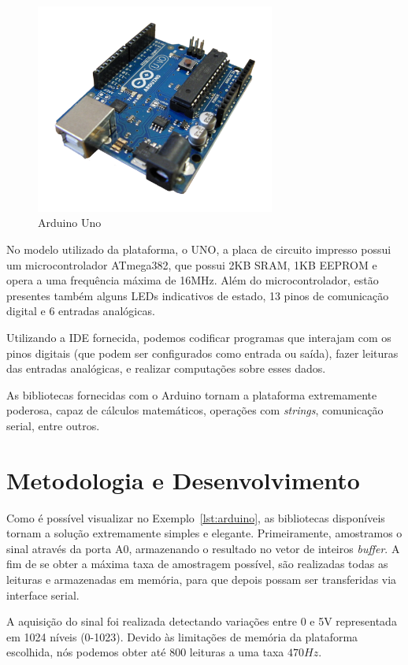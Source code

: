 \documentclass[12pt,a4paper]{report}
\begin{document}
\begin{figure}[h]
\centering
\includegraphics[width=0.7\textwidth]{arduino.png}
\caption{Arduino Uno}
\label{fig:arduino}
\end{figure}

No modelo utilizado da plataforma, o UNO, a placa de circuito impresso possui um microcontrolador ATmega382, que possui 2KB SRAM, 1KB EEPROM e opera a uma frequência máxima de 16MHz. Além do microcontrolador, estão presentes também alguns LEDs indicativos de estado, 13 pinos de comunicação digital e 6 entradas analógicas.

Utilizando a IDE fornecida, podemos codificar programas que interajam com os pinos digitais (que podem ser configurados como entrada ou saída), fazer leituras das entradas analógicas, e realizar computações sobre esses dados.

As bibliotecas fornecidas com o Arduino tornam a plataforma extremamente poderosa, capaz de cálculos matemáticos, operações com \textit{strings}, comunicação serial, entre outros.

\section{Metodologia e Desenvolvimento}

Como é possível visualizar no Exemplo~\ref{lst:arduino}, as bibliotecas disponíveis tornam a solução extremamente simples e elegante. Primeiramente, amostramos o sinal através da porta A0, armazenando o resultado no vetor de inteiros \textit{buffer}. A fim de se obter a máxima taxa de amostragem possível, são realizadas todas as leituras e armazenadas em memória, para que depois possam ser transferidas via interface serial.

A aquisição do sinal foi realizada detectando variações entre 0 e 5V representada em 1024 níveis (0-1023). Devido às limitações de memória da plataforma escolhida, nós podemos obter até 800 leituras a uma taxa \(470Hz\).
\end{document}
